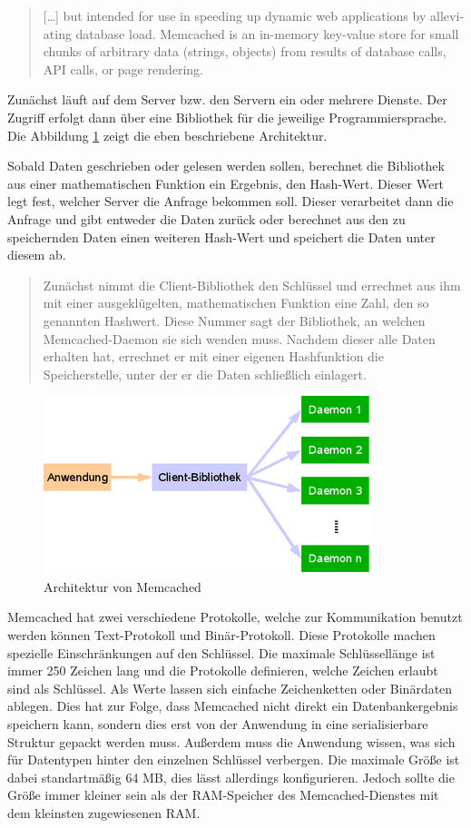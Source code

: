 \foreignblockquote{english}[\cite{Memcached2015}]{[\dots{}] but intended for
use in speeding up dynamic web applications by alleviating database load.
Memcached is an in-memory key-value store for small chunks of arbitrary
data (strings, objects) from results of database calls, API calls, or page
rendering.}

Zunächst läuft auf dem Server bzw. den Servern ein oder mehrere Dienste. Der
Zugriff erfolgt dann über eine Bibliothek für die jeweilige Programmiersprache.
Die Abbildung \ref{fig:memcached-architecture} zeigt die eben beschriebene
Architektur.

Sobald Daten geschrieben oder gelesen werden sollen, berechnet die Bibliothek
aus einer mathematischen Funktion ein Ergebnis, den Hash-Wert. Dieser Wert legt
fest, welcher Server die Anfrage bekommen soll. Dieser verarbeitet dann die
Anfrage und gibt entweder die Daten zurück oder berechnet aus den zu
speichernden Daten einen weiteren Hash-Wert und speichert die Daten unter
diesem ab.

\blockquote[\cite{Schuermann2009}]{Zunächst nimmt die Client-Bibliothek den
Schlüssel und errechnet aus ihm mit einer ausgeklügelten, mathematischen
Funktion eine Zahl, den so genannten Hashwert. Diese Nummer sagt der Bibliothek,
an welchen Memcached-Daemon sie sich wenden muss. Nachdem dieser alle Daten
erhalten hat, errechnet er mit einer eigenen Hashfunktion die Speicherstelle,
unter der er die Daten schließlich einlagert.}

\begin{figure}
\centering
\includegraphics{images/memcached_illustration_large.png}
\caption{Architektur von Memcached \cite{Schuermann2009}}
\label{fig:memcached-architecture}
\end{figure}

Memcached hat zwei verschiedene Protokolle, welche zur Kommunikation benutzt
werden können Text-Protokoll und Binär-Protokoll. Diese Protokolle machen
spezielle Einschränkungen auf den Schlüssel. Die maximale Schlüssellänge ist
immer 250 Zeichen lang und die Protokolle definieren, welche Zeichen erlaubt
sind als Schlüssel. Als Werte lassen sich einfache Zeichenketten oder
Binärdaten ablegen. Dies hat zur Folge, dass Memcached nicht direkt ein
Datenbankergebnis speichern kann, sondern dies erst von der Anwendung in eine
serialisierbare Struktur gepackt werden muss. Außerdem muss die Anwendung
wissen, was sich für Datentypen hinter den einzelnen Schlüssel verbergen.
Die maximale Größe ist dabei standartmäßig 64 MB, dies lässt allerdings
konfigurieren. Jedoch sollte die Größe immer kleiner sein als
der \gls{RAM}-Speicher des Memcached-Dienstes mit dem kleinsten
zugewiesenen \gls{RAM}.

